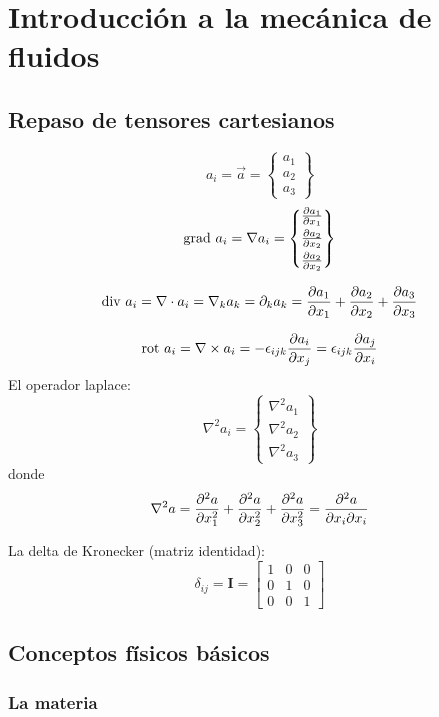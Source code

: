 
\section{Introducción a la mecánica de fluidos}
\subsection{Repaso de tensores cartesianos}
\[
a_i =\vec{a}= \begin{Bmatrix}
a_1 \\
a_2 \\
a_3
\end{Bmatrix}%
\]
\[
\gradient a_i=\nabla a_i = 
\begin{Bmatrix}
\vspace{.1cm}\spartial{a_1}{x_1} \\
\vspace{.1cm}\spartial{a_2}{x_2} \\
\spartial{a_2}{x_2}
\end{Bmatrix}%
\]

\[
\textrm{div } a_i = \nabla \cdot a_i=\nabla_k a_k=\partial_k a_k =\frac{\partial a_1}{\partial x_1}+\frac{\partial a_2}{\partial x_2}+\frac{\partial a_3}{\partial x_3}
\]

\[
\textrm{rot } a_i = \nabla \times a_i  = -\epsilon_{ijk} \frac{\partial a_i}{\partial x_j}= \epsilon_{ijk} \frac{\partial a_j}{\partial x_i}
\]
El operador laplace:
\[
\nabla^2 a_i= \begin{Bmatrix}
\nabla^2 a_1 \\
\nabla^2 a_2 \\
\nabla^2 a_3
\end{Bmatrix} 
\]
donde
\[
\nabla^2 a = \frac{\partial^2 a}{\partial x_1 ^2}+\frac{\partial^2 a}{\partial x_2 ^2}+\frac{\partial^2 a}{\partial x_3 ^2}=\frac{\partial^2 a}{\partial x_i \partial x_i} 
\]

La delta de Kronecker (matriz identidad):
\[
\delta_{ij}=\mathbf{I}=\begin{bmatrix}
1 & 0& 0\\
0 & 1 & 0\\
0 & 0 &1
\end{bmatrix}
\]
\subsection{Conceptos físicos básicos}
\subsubsection*{La materia}

